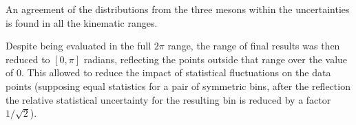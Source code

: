 An agreement of the distributions from the three mesons within the uncertainties is found in all the kinematic ranges.

Despite being evaluated in the full $2\pi$ range, the range of final results was then reduced to $[0,\pi]$ radians, reflecting the points outside that range over the value of 0. This allowed to reduce the impact of statistical fluctuations on the data points (supposing equal statistics for a pair of symmetric bins, after the reflection the relative statistical uncertainty for the resulting bin is reduced by a factor $1/\sqrt{2}$).




